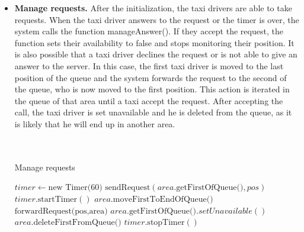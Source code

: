 \begin{itemize}
			
			\newpage
			\item \textbf{Manage requests.} After the initialization, the taxi drivers are able to take requests. When the taxi driver answers to the request or the timer is over, the system calls the function manageAnswer(). If they accept the request, the function sets their availability to false and stops monitoring their position. It is also possible that a taxi driver declines the request or is not able to give an answer to the server. In this case, the first taxi driver is moved to the last position of the queue and the system forwards the request to the second of the queue, who is now moved to the first position. This action is iterated in the queue of that area until a taxi accept the request. After accepting the call, the taxi driver is set unavailable and he is deleted from the queue, as it is likely that he will end up in another area.\\
			 \\\\
				\begin{algorithm}
					\caption{Manage requests}
					\begin{algorithmic}[1]
						\State $timer \gets \text{new Timer(60)}$
						\State $\text{sendRequest}(area.\text{getFirstOfQueue()}, pos)$
						\State $timer.\text{startTimer}()$
						\EndProcedure
							\State $area.\text{moveFirstToEndOfQueue()}$
							\State $\text{forwardRequest(pos,area)}$
						\EndIf
							\State $area.\text{getFirstOfQueue()}.setUnavailable()$
							\State $area.\text{deleteFirstFromQueue()}$
						\EndIf
						\State $timer.\text{stopTimer}()$
						\EndProcedure
					\end{algorithmic}
				\end{algorithm}
			

\end{itemize}
